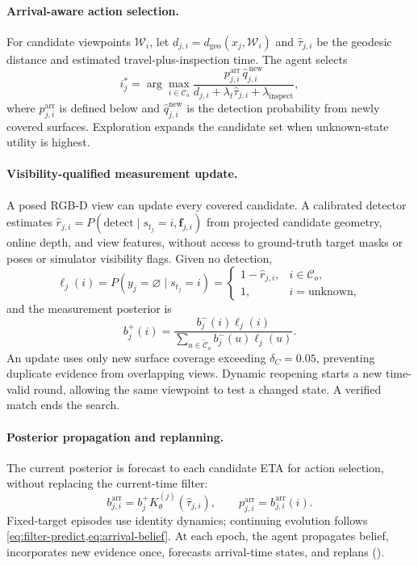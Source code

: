 \paragraph{Arrival-aware action selection.}
For candidate viewpoints $\mathcal W_i$, let
$d_{j,i}=d_{\mathrm{geo}}(x_j,\mathcal W_i)$ and $\widehat\tau_{j,i}$ be
the geodesic distance and estimated travel-plus-inspection time. The agent selects
\begin{equation}
i_j^*=\arg\max_{i\in\mathcal{C}_o}
\frac{
    p_{j,i}^{\mathrm{arr}}\,
    \widehat{q}_{j,i}^{\,\mathrm{new}}
}{
    d_{j,i}
    + \lambda_t \widehat{\tau}_{j,i}
    + \lambda_{\mathrm{inspect}}
},
\label{eq:planner}
\end{equation}
where $p_{j,i}^{\mathrm{arr}}$ is defined below and
$\widehat q_{j,i}^{\mathrm{new}}$ is the detection probability from newly covered
surfaces. Exploration expands the candidate set when unknown-state utility is highest.

\paragraph{Visibility-qualified measurement update.}
A posed RGB-D view can update every covered candidate. A calibrated detector estimates
$\widehat r_{j,i}=P(\mathrm{detect}\mid s_{t_j}=i,\mathbf f_{j,i})$ from
projected candidate geometry, online depth, and view features, without access to
ground-truth target masks or poses or simulator visibility flags. Given no detection,
\begin{equation}
\ell_j(i)=P(y_j=\varnothing\mid s_{t_j}=i)=
\begin{cases}
1-\widehat r_{j,i}, & i\in\mathcal C_o,\\
1, & i=\mathrm{unknown},
\end{cases}
\label{eq:negative}
\end{equation}
and the measurement posterior is
\begin{equation}
b_j^+(i)=\frac{b_j^-(i)\ell_j(i)}
{\sum_{u\in\widetilde{\mathcal C}_o}b_j^-(u)\ell_j(u)}.
\label{eq:bayes}
\end{equation}
An update uses only new surface coverage exceeding $\delta_C=0.05$, preventing
duplicate evidence from overlapping views. Dynamic reopening starts a new
time-valid round, allowing the same viewpoint to test a changed state. A verified match ends the search.

\paragraph{Posterior propagation and replanning.}
The current posterior is forecast to each candidate ETA for action selection,
without replacing the current-time filter:
\begin{equation}
b_{j,i}^{\mathrm{arr}}=b_j^+K_\theta^{(j)}(\widehat\tau_{j,i}),\qquad
p_{j,i}^{\mathrm{arr}}=b_{j,i}^{\mathrm{arr}}(i).
\label{eq:arrival-belief}
\end{equation}
Fixed-target episodes use identity dynamics; continuing evolution follows
\cref{eq:filter-predict,eq:arrival-belief}. At each epoch, the agent propagates
belief, incorporates new evidence once, forecasts arrival-time states, and replans
().

